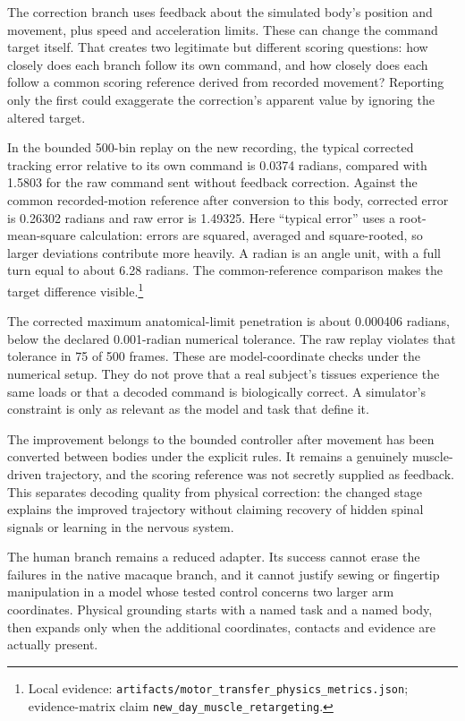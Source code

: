 The correction branch uses feedback about the simulated body's position and movement, plus speed and acceleration limits. These can change the command target itself. That creates two legitimate but different scoring questions: how closely does each branch follow its own command, and how closely does each follow a common scoring reference derived from recorded movement? Reporting only the first could exaggerate the correction's apparent value by ignoring the altered target.

In the bounded 500-bin replay on the new recording, the typical corrected tracking error relative to its own command is 0.0374 radians, compared with 1.5803 for the raw command sent without feedback correction. Against the common recorded-motion reference after conversion to this body, corrected error is 0.26302 radians and raw error is 1.49325. Here ``typical error'' uses a root-mean-square calculation: errors are squared, averaged and square-rooted, so larger deviations contribute more heavily. A radian is an angle unit, with a full turn equal to about 6.28 radians. The common-reference comparison makes the target difference visible.\footnote{Local evidence: \texttt{artifacts/motor\_transfer\_physics\_metrics.json}; evidence-matrix claim \texttt{new\_day\_muscle\_retargeting}.}

The corrected maximum anatomical-limit penetration is about 0.000406 radians, below the declared 0.001-radian numerical tolerance. The raw replay violates that tolerance in 75 of 500 frames. These are model-coordinate checks under the numerical setup. They do not prove that a real subject's tissues experience the same loads or that a decoded command is biologically correct. A simulator's constraint is only as relevant as the model and task that define it.

The improvement belongs to the bounded controller after movement has been converted between bodies under the explicit rules. It remains a genuinely muscle-driven trajectory, and the scoring reference was not secretly supplied as feedback. This separates decoding quality from physical correction: the changed stage explains the improved trajectory without claiming recovery of hidden spinal signals or learning in the nervous system.

The human branch remains a reduced adapter. Its success cannot erase the failures in the native macaque branch, and it cannot justify sewing or fingertip manipulation in a model whose tested control concerns two larger arm coordinates. Physical grounding starts with a named task and a named body, then expands only when the additional coordinates, contacts and evidence are actually present.

